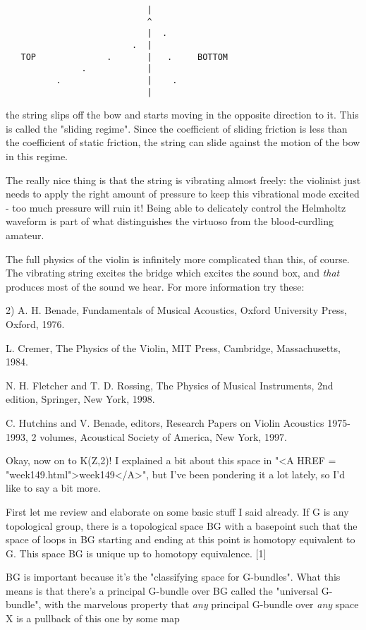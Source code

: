 \begin{verbatim}
                            |
                            ^
                            |  .
                         .  | 
   TOP              .       |   .     BOTTOM
               .            | 
          .                 |    .
                            |
\end{verbatim}
    
the string slips off the bow and starts moving in the opposite direction
to it.   This is called the "sliding regime".  Since the coefficient of
sliding friction is less than the coefficient of static friction, the
string can slide against the motion of the bow in this regime.

The really nice thing is that the string is vibrating almost freely: the
violinist just needs to apply the right amount of pressure to keep this
vibrational mode excited - too much pressure will ruin it!  Being able
to delicately control the Helmholtz waveform is part of what distinguishes 
the virtuoso from the blood-curdling amateur.

The full physics of the violin is infinitely more complicated than this,
of course.  The vibrating string excites the bridge which excites the
sound box, and \emph{that} produces most of the sound we hear.  For more
information try these:

2) A. H. Benade, Fundamentals of Musical Acoustics, Oxford University
Press, Oxford, 1976.

L. Cremer, The Physics of the Violin, MIT Press, Cambridge, Massachusetts,
1984.

N. H. Fletcher and T. D. Rossing, The Physics of Musical Instruments, 
2nd edition, Springer, New York, 1998.

C. Hutchins and V. Benade, editors, Research Papers on Violin Acoustics
1975-1993, 2 volumes, Acoustical Society of America, New York, 1997.

Okay, now on to K(Z,2)!  I explained a bit about this space in "<A HREF = "week149.html">week149</A>",
but I've been pondering it a lot lately, so I'd like to say a bit more.  

First let me review and elaborate on some basic stuff I said already.   
If G is any topological group, there is a topological 
space BG with a basepoint such that the space of loops in BG starting 
and ending at this point is homotopy equivalent to G.  This space BG 
is unique up to homotopy equivalence.  [1]

BG is important because it's the "classifying space for G-bundles".  
What this means is that there's a principal G-bundle over BG called
the "universal G-bundle", with the marvelous property that \emph{any}
principal G-bundle over \emph{any} space X is a pullback of this one by 
some map

